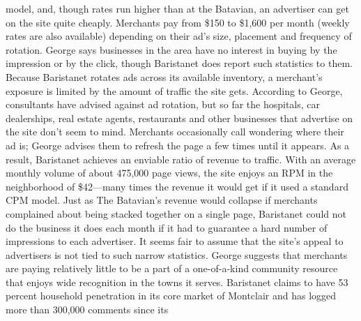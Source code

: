 model, and, though rates run higher than at the Batavian, an advertiser can get
on the site quite cheaply. Merchants pay from \$150 to \$1,600 per month (weekly
rates are also available) depending on their ad's size, placement and frequency
of rotation. George says businesses in the area have no interest in buying by the
impression or by the click, though Baristanet does report such statistics to them.
Because Baristanet rotates ads across its available inventory, a merchant's exposure
is limited by the amount of traffic the site gets. According to George, consultants
have advised against ad rotation, but so far the hospitals, car dealerships,
real estate agents, restaurants and other businesses that advertise on the site don't
seem to mind. Merchants occasionally call wondering where their ad is; George
advises them to refresh the page a few times until it appears.
As a result, Baristanet achieves an enviable ratio of revenue to traffic. With an
average monthly volume of about 475,000 page views, the site enjoys an RPM
in the neighborhood of \$42—many times the revenue it would get if it used a
standard CPM model. Just as The Batavian's revenue would collapse if merchants
complained about being stacked together on a single page, Baristanet could not
do the business it does each month if it had to guarantee a hard number of impressions
to each advertiser.
It seems fair to assume that the site's appeal to advertisers is not tied to such
narrow statistics. George suggests that merchants are paying relatively little to be a
part of a one-of-a-kind community resource that enjoys wide recognition in the
towns it serves. Baristanet claims to have 53 percent household penetration in its
core market of Montclair and has logged more than 300,000 comments since its


